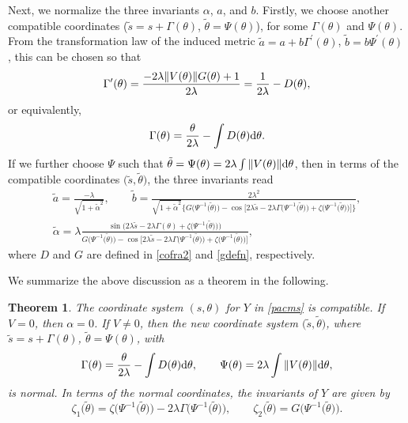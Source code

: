 \documentclass[10pt,a4paper]{amsart}
\numberwithin{equation}{section}
\newtheorem{Theorem}{Theorem}[section]
\begin{document}
Next, we normalize the three invariants $\alpha $, $a$, and $b$.
Firstly, we choose another compatible coordinates ($ \tilde{s}=s+\Gamma
( \theta )$, $\tilde{\theta}=\Psi ( \theta ) $), for some $\Gamma ( \theta ) $ and $\Psi ( \theta
) $. From the transformation law of the induced metric
$
\tilde{a}=a+b\Gamma^{\prime }( \theta )$, $\tilde{b}=b\Psi
^{\prime }( \theta )$,
this can be chosen so that
\begin{gather*}
\Gamma ^{\prime}( \theta ) =\frac{-2\lambda \Vert V(
\theta ) \Vert G( \theta ) +1}{2\lambda } =\frac{1}{2\lambda }-D( \theta ) , \notag
\end{gather*}
or equivalently,
\begin{equation*}%
\Gamma ( \theta ) =\frac{\theta }{2\lambda }-\int D( \theta
) {\rm d}\theta .
\end{equation*}
If we further choose $\Psi $ such that $\tilde{\theta}=\Psi ( \theta
) =2\lambda \int \Vert V( \theta ) \Vert
{\rm d}\theta $, then in terms of the compatible coordinates $\bigl( \tilde{s},\tilde{\theta}\bigr) $, the three invariants read
\begin{gather*}
\tilde{a} = \frac{-\lambda }{\sqrt{1+\tilde{\alpha}^{2}}}, \qquad
\tilde{b} = \frac{2\lambda ^{2}}{\sqrt{1+\tilde{\alpha}^{2}}\big\{
G\bigl( \Psi ^{-1}\bigl( \tilde{\theta}\bigr) \bigr) -\cos \bigl[ 2\lambda
\tilde{s}-2\lambda \Gamma \bigl( \Psi ^{-1}\bigl( \tilde{\theta}\bigr)
\bigr) +\zeta \bigl( \Psi ^{-1}\bigl( \tilde{\theta}\bigr) \bigr) \bigr]
\big\} }, \\
\tilde{\alpha} = \lambda \frac{\sin \bigl( 2\lambda \tilde{s}-2\lambda
\Gamma ( \theta ) +\zeta \bigl( \Psi ^{-1}\bigl( \tilde{\theta}
\bigr) \bigr) \bigr) }{G\bigl( \Psi ^{-1}\bigl( \tilde{\theta}\bigr)
\bigr) -\cos \bigl[ 2\lambda \tilde{s}-2\lambda \Gamma \bigl( \Psi
^{-1}\bigl( \tilde{\theta}\bigr) \bigr) +\zeta \bigl( \Psi ^{-1}\bigl(
\tilde{\theta}\bigr) \bigr) \bigr] },
\end{gather*}
where $D$ and $G$ are defined in \eqref{cofra2} and \eqref{gdefn}, respectively.

We summarize the above discussion as a theorem in the following.


\begin{Theorem}
\label{construction} The coordinate system $(s,\theta)$ for $Y$ in \eqref{pacms}
is compatible. If $V=0$, then $\alpha=0$. If $V\neq 0$, then the new coordinate system $\bigl(\tilde{s},\tilde{\theta}\bigr)$, where
$
\tilde{s}=s+\Gamma(\theta)$, $ \tilde{\theta}=\Psi( \theta)$,
with
\[
\Gamma(\theta)=\frac{\theta }{2\lambda}-\int D( \theta) {\rm d}\theta,\qquad
\Psi(\theta)=2\lambda \int \Vert V(\theta) \Vert {\rm d}\theta ,
\]
is normal. In terms of the
normal coordinates, the invariants of $Y$ are given by
\begin{equation}
\zeta _{1}\bigl( \tilde{\theta}\bigr) = \zeta \bigl( \Psi ^{-1}\bigl(
\tilde{\theta}\bigr) \bigr) -2\lambda \Gamma \bigl( \Psi ^{-1}\bigl(
\tilde{\theta}\bigr) \bigr) , \qquad
\zeta _{2}\bigl( \tilde{\theta}\bigr) = G\bigl( \Psi ^{-1}\bigl( \tilde{
\theta}\bigr) \bigr). \label{invariants}
\end{equation}
\end{Theorem}
\end{document}
